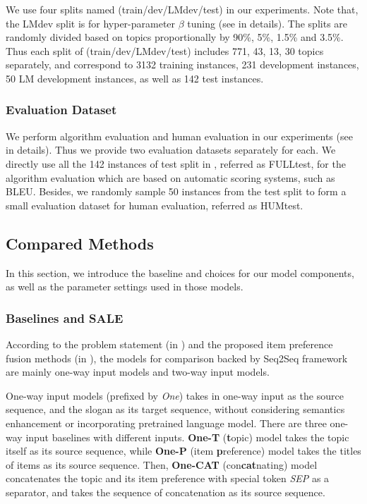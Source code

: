We use four splits named (train/dev/LMdev/test) in our experiments.
Note that, the LMdev split is for 
hyper-parameter $\beta$ tuning (see  in details).
The splits are randomly divided based on topics 
proportionally by 90\%, 5\%, 1.5\% and 3.5\%.
Thus each split of (train/dev/LMdev/test) includes 771, 43, 13, 30 topics separately,
and correspond to 3132 training instances, 231 development instances, 
50 LM development instances, as well as 142 test instances.

\subsubsection{Evaluation Dataset}
\label{sec:eval_dataset}
We perform algorithm evaluation and human evaluation
in our experiments (see  in details).
Thus we provide two evaluation datasets separately for each.
We directly use all the 142 instances of test split in ,
referred as FULLtest,
for the algorithm evaluation which are based on automatic scoring systems,
such as BLEU.
Besides, we randomly sample 50 instances from the test split
to form a small evaluation dataset for human evaluation,
referred as HUMtest.


\subsection{Compared Methods}
\label{sec:compared}
In this section, we introduce the baseline and choices for 
our model components, as well as the parameter settings
used in those models.

\subsubsection{Baselines and SALE}
\label{sec:baselines}
According to the problem statement (in )
and the proposed item preference fusion methods (in ),
the models for comparison backed by Seq2Seq framework are mainly one-way input models and two-way input models.

One-way input models (prefixed by \emph{One}) takes in one-way input as the source sequence,
and the slogan as its target sequence, without considering 
semantics enhancement or incorporating pretrained language model.
There are three one-way input baselines with different inputs.
\textbf{One-T} (\textbf{t}opic) model
takes the topic itself as its source sequence,
while \textbf{One-P} (item \textbf{p}reference) model takes
the titles of items as its source sequence.
Then, 
\textbf{One-CAT} (con\textbf{cat}nating) model 
concatenates the topic and its item preference with special token \emph{SEP}
as a separator, and takes the sequence of concatenation as its source sequence.

